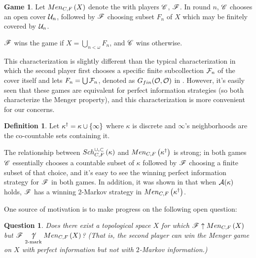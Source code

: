 \documentclass{amsart}
\theoremstyle{plain}
\newtheorem{question}[theorem]{Question}
\theoremstyle{definition}
\newtheorem{definition}[theorem]{Definition}
\newtheorem{game}[theorem]{Game}
\theoremstyle{remark}
\theoremstyle{plain}
\theoremstyle{definition}
\theoremstyle{remark}
\begin{document}
  \begin{game}
    Let \(Men_{C,F}\left({X}\right)\) denote the  with players \(\mathscr{C}\),
    \(\mathscr{F}\).
    In round \(n\), \(\mathscr{C}\) chooses an open cover \(\mathcal{U}_n\), followed by
    \(\mathscr{F}\)
    choosing subset \(F_n\) of \(X\) which may be finitely covered by \(\mathcal{U}_n\).

    \(\mathscr{F}\) wins the game if \(X = \bigcup_{n<\omega}F_n\),
    and \(\mathscr{C}\) wins otherwise.
  \end{game}

  This characterization is slightly different than the typical characterization
  in which the second player first chooses a specific
  finite subcollection \(\mathcal{F}_n\) of the cover itself and lets
  \(F_n=\bigcup \mathcal{F}_n\), denoted as \(G_{fin}(\mathcal{O},\mathcal{O})\)
  in \cite{MR1378387}.
  However, it's easily seen that these games are equivalent
  for perfect information strategies (so both characterize
  the Menger property), and this characterization is
  more convenient for our concerns.

  \begin{definition}
    Let \(\kappa^\dagger=\kappa\cup\{\infty\}\) where \(\kappa\) is
    discrete and \(\infty\)'s neighborhoods are the co-countable sets
    containing it.
  \end{definition}

  The relationship between \(Sch^{\cup,\subset}_{C,F}\left({\kappa}\right)\) and
  \(Men_{C,F}\left({\kappa^\dagger}\right)\) is strong; in both games \(\mathscr{C}\) essentially
  chooses a countable subset of \(\kappa\) followed by \(\mathscr{F}\) choosing
  a finite subset of that choice, and it's easy to see the winning perfect
  information strategy for \(\mathscr{F}\) in both games.
  In addition, it was shown in
  \cite{clontzMengerGamePreprint} that when \(\mathcal{A}(\kappa)\) holds,
  \(\mathscr{F}\) has a winning \(2\)-Markov strategy in
  \(Men_{C,F}\left({\kappa^\dagger}\right)\).

  One source of motivation is to make progress on the following open question:

  \begin{question}\label{mainQuestion}
    Does there exist a topological space \(X\) for which
    \(\mathscr{F}\uparrow Men_{C,F}\left({X}\right)\) but \(\mathscr{F}\underset{2\text{-mark}}{\not\uparrow}Men_{C,F}\left({X}\right)\)?
    (That is, the second player can win the Menger game on \(X\)
    with perfect information but not with \(2\)-Markov information.)
  \end{question}
\end{document}
